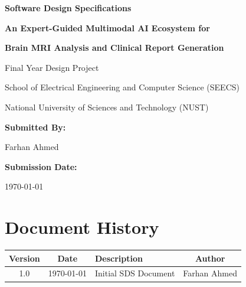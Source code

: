 \documentclass[12pt,a4paper]{article}
\begin{document}
\begin{titlepage}
    \centering
    \vspace*{2cm}
    
    {\huge\bfseries Software Design Specifications\par}
    \vspace{1cm}
    
    {\Large\bfseries An Expert-Guided Multimodal AI Ecosystem for\par}
    {\Large\bfseries Brain MRI Analysis and Clinical Report Generation\par}
    \vspace{2cm}
    
    {\Large Final Year Design Project\par}
    \vspace{1cm}
    
    {\large School of Electrical Engineering and Computer Science (SEECS)\par}
    {\large National University of Sciences and Technology (NUST)\par}
    \vspace{2cm}
    
    {\large\bfseries Submitted By:\par}
    {\large Farhan Ahmed\par}
    \vspace{1cm}
    
    {\large\bfseries Submission Date:\par}
    {\large \today\par}
    
    \vfill
\end{titlepage}

\tableofcontents
\newpage

\section*{Document History}

\begin{table}[H]
\centering
\begin{tabularx}{\textwidth}{|c|c|X|c|}
\hline
\textbf{Version} & \textbf{Date} & \textbf{Description} & \textbf{Author} \\
\hline
1.0 & \today & Initial SDS Document & Farhan Ahmed \\
\hline
\end{tabularx}
\end{table}
\end{document}
